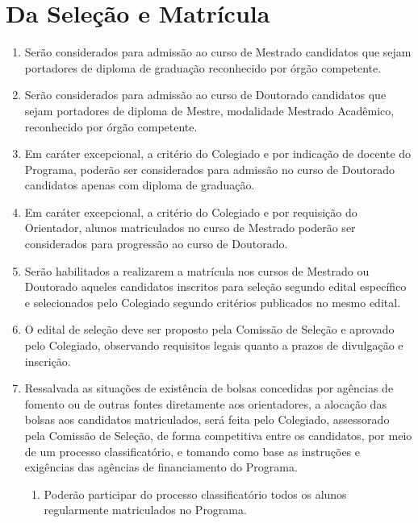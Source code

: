 \documentclass{article}
\begin{document}
\section{Da Seleção e Matrícula}
\begin{enumerate}
	\item Serão considerados para admissão ao curso de Mestrado candidatos que sejam portadores de diploma de graduação reconhecido por órgão competente.

	\item Serão considerados para admissão ao curso de Doutorado candidatos que sejam portadores de diploma de Mestre, modalidade Mestrado Acadêmico, reconhecido por órgão competente.

	\item Em caráter excepcional, a critério do Colegiado e por indicação de docente do Programa, poderão ser considerados para admissão no curso de Doutorado candidatos apenas com diploma de graduação.

	\item Em caráter excepcional, a critério do Colegiado e por requisição do Orientador, alunos matriculados no curso de Mestrado poderão ser considerados para progressão ao curso de Doutorado.

	\item Serão habilitados a realizarem a matrícula nos cursos de Mestrado ou Doutorado aqueles candidatos inscritos para seleção segundo edital específico e selecionados pelo Colegiado segundo critérios publicados no mesmo edital.

	\item O edital de seleção deve ser proposto pela Comissão de Seleção e aprovado pelo Colegiado, observando requisitos legais quanto a prazos de divulgação e inscrição.

	\item Ressalvada as situações de existência de bolsas concedidas por agências de fomento ou de outras fontes diretamente aos orientadores, a alocação das bolsas aos candidatos matriculados, será feita pelo Colegiado, assessorado pela Comissão de Seleção, de forma competitiva entre os candidatos, por meio de um processo classificatório, e tomando como base as instruções e exigências das agências de financiamento do Programa.
	\begin{enumerate}
		\item Poderão participar do processo classificatório todos os alunos regularmente matriculados no Programa.
	\end{enumerate}
	

\end{enumerate}
\end{document}
